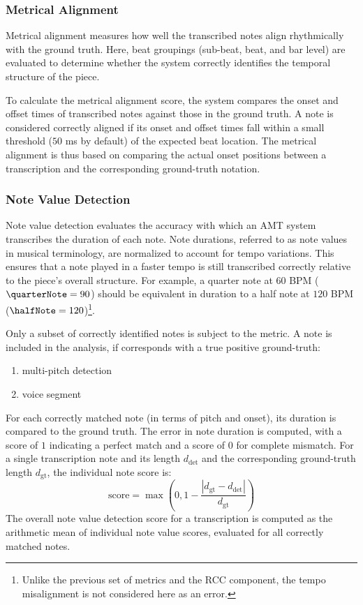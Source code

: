 \subsubsection{Metrical Alignment}

Metrical alignment measures how well the transcribed notes align rhythmically with the ground truth. Here, beat groupings (sub-beat, beat, and bar level) are evaluated to determine whether the system correctly identifies the temporal structure of the piece.

To calculate the metrical alignment score, the system compares the onset and offset times of transcribed notes against those in the ground truth. A note is considered correctly aligned if its onset and offset times fall within a small threshold ($50$ ms by default) of the expected beat location. The metrical alignment is thus based on comparing the actual onset positions between a transcription and the corresponding ground-truth notation.

\subsubsection{Note Value Detection}

Note value detection evaluates the accuracy with which an AMT system transcribes the duration of each note. Note durations, referred to as note values in musical terminology, are normalized to account for tempo variations. This ensures that a note played in a faster tempo is still transcribed correctly relative to the piece's overall structure. For example, a quarter note at $60$ BPM ($\quarterNote = 90$) should be equivalent in duration to a half note at $120$ BPM ($\halfNote = 120$)\footnote{Unlike the previous set of metrics and the RCC component, the tempo misalignment is not considered here as an error.}.

Only a subset of correctly identified notes is subject to the metric. A note is included in the analysis, if corresponds with a true positive ground-truth: \begin{enumerate}
	\item multi-pitch detection
	\item voice segment
\end{enumerate}

For each correctly matched note (in terms of pitch and onset), its duration is compared to the ground truth. The error in note duration is computed, with a score of $1$ indicating a perfect match and a score of $0$ for complete mismatch. For a single transcription note and its length $d_{\textrm{det}}$ and the corresponding ground-truth length $d_{\textrm{gt}}$, the individual note score is: \[\textrm{score} = \max\left(0, 1 - \frac{\left|d_{\textrm{gt}} - d_{\textrm{det}}\right|}{d_{\textrm{gt}}}\right)\] The overall note value detection score for a transcription is computed as the arithmetic mean of individual note value scores, evaluated for all correctly matched notes. 

